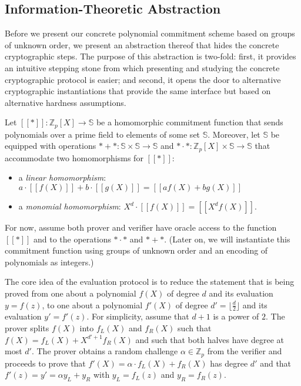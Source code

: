 \subsection{Information-Theoretic Abstraction}
\label{sec:abstraction}

Before we present our concrete polynomial commitment scheme based on groups of unknown order, we present an abstraction thereof that hides the concrete cryptographic steps. The purpose of this abstraction is two-fold: first, it provides an intuitive stepping stone from which presenting and studying the concrete cryptographic protocol is easier; and second, it opens the door to alternative cryptographic instantiations that provide the same interface but based on alternative hardness assumptions. %

Let $[\![ * ]\!] : \mathbb{Z}_p[X] \rightarrow \mathbb{S}$ be a homomorphic commitment function that sends polynomials over a prime field to elements of some set $\mathbb{S}$. Moreover, let $\mathbb{S}$ be equipped with operations $* + * : \mathbb{S} \times \mathbb{S} \rightarrow \mathbb{S}$ and $ * \cdot * : \mathbb{Z}_p[X] \times \mathbb{S} \rightarrow \mathbb{S}$ that accommodate two homomorphisms for $[\![ * ]\!]$:
\begin{itemize}[nolistsep]
    \item a \emph{linear homomorphism}: $a \cdot [\![f(X)]\!] + b \cdot [\![g(X)]\!] = [\![af(X) + bg(X)]\!]$
    \item a \emph{monomial homomorphism}: $X^d \cdot [\![f(X)]\!] = [\![X^d f(X)]\!]$.
\end{itemize}
For now, assume both prover and verifier have oracle access to the function $[\![*]\!]$ and to the operations $ * \cdot *$ and $* + *$. (Later on, we will instantiate this commitment function using groups of unknown order and an encoding of polynomials as integers.)

The core idea of the evaluation protocol is to reduce the statement that is being proved from one about a polynomial $f(X)$ of degree $d$ and its evaluation $y = f(z)$, to one about a polynomial $f'(X)$ of degree $d'=\lfloor\frac{d}{2}\rfloor$ and its evaluation $y' = f'(z)$. For simplicity, assume that $d+1$ is a power of $2$.
The prover splits $f(X)$ into $f_L(X)$ and $f_R(X)$ such that $f(X) = f_L(X) + X^{d'+1} f_R(X)$ and such that both halves have degree at most $d'$. The prover obtains a random challenge $\alpha \in  \mathbb{Z}_p$ from the verifier and proceeds to prove that $f'(X)=\alpha \cdot f_L(X) + f_R(X)$ has degree $d'$ and that $f'(z) = y' = \alpha y_L + y_R$ with $y_L = f_L(z)$ and $y_R = f_R(z)$. 

